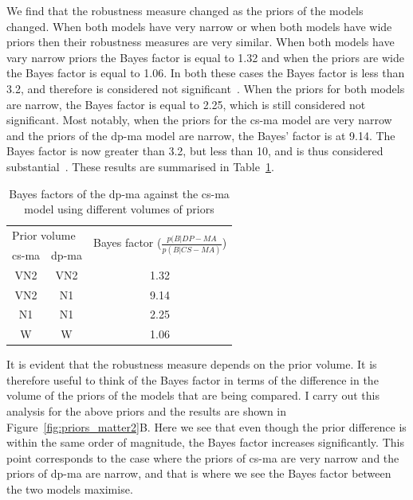 We find that the robustness measure changed as the priors of the models changed. When both models have very narrow or when both models have wide priors then their robustness measures are very similar. When both models have vary narrow priors the Bayes factor is equal to 1.32 and when the priors are wide the Bayes factor is equal to 1.06. In both these cases the Bayes factor is less than 3.2, and therefore is considered not significant~\autocite{Kass:1995vb}. When the priors for both models are narrow, the Bayes factor is equal to 2.25, which is still considered not significant. Most notably, when the priors for the \acrshort{cs-ma} model are very narrow and the priors of the \acrshort{dp-ma} model are narrow, the Bayes' factor is at 9.14. The Bayes factor is now greater than 3.2, but less than 10, and is thus considered substantial~\autocite{Kass:1995eh}.  These results are summarised in Table~\ref{tab:bayes_vols}.

\begin{table}[tb]
\centering
\caption{Bayes factors of the \acrshort{dp-ma} against the \acrshort{cs-ma}  model using different volumes of priors}
\label{tab:bayes_vols}
\begin{tabular}{@{}ccc@{}}
\toprule
\multicolumn{2}{l}{Prior volume} & \multirow{2}{4cm}{Bayes factor  ($\frac{p(B|DP-MA}{p(B|CS-MA)}$)  } \\ \cmidrule(r){1-2}
\acrshort{cs-ma}  & \acrshort{dp-ma} &  \\ \midrule
VN2 & VN2 & 1.32 \\
VN2 & N1 & 9.14 \\
N1 & N1 & 2.25 \\
W & W & 1.06 \\ \bottomrule
\end{tabular}
\end{table}

It is evident that the robustness measure depends on the prior volume. It is therefore useful to think of the Bayes factor in terms of the difference in the volume of the priors of the models that are being compared. I carry out this analysis for the above priors and the results are shown in Figure~\ref{fig:priors_matter2}B. Here we see that even though the prior difference is within the same order of magnitude, the Bayes factor increases significantly. This point corresponds to the case where the priors of \acrshort{cs-ma} are very narrow and the priors of \acrshort{dp-ma} are narrow, and that is where we see the Bayes factor between the two models maximise. %

